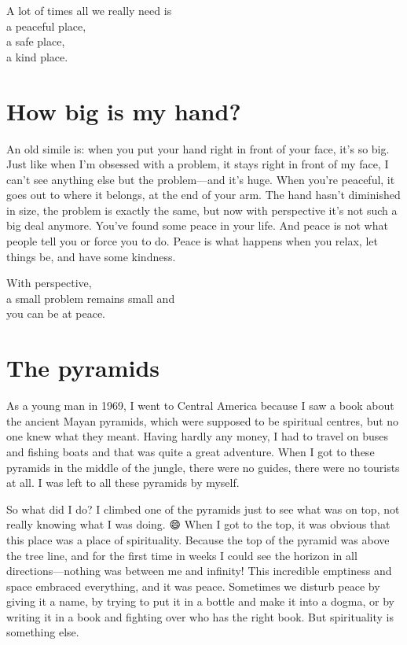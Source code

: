 \documentclass[12pt, openany]{book}
\newenvironment{aphorism}%
{%
\begin{center}\begin{itshape}
}%
{\end{itshape}\end{center}
}%
\begin{document}
\begin{aphorism}
A lot of times all we really need is\\  
a peaceful place,\\ 
a safe place,\\  
a kind place.
\end{aphorism}

\section*{How big is my hand?}

An old simile is: when you put your hand right in front of your face, it’s so big. Just like when I’m obsessed with a problem, it stays right in front of my face, I can’t see anything else but the problem—and it’s huge. When you’re peaceful, it goes out to where it belongs, at the end of your arm. The hand hasn’t diminished in size, the problem is exactly the same, but now with perspective it’s not such a big deal anymore. You’ve found some peace in your life. And peace is not what people tell you or force you to do. Peace is what happens when you relax, let things be, and have some kindness. 

\begin{aphorism}
With perspective,\\  
a small problem remains small and\\ 
you can be at peace.
\end{aphorism}

\section*{The pyramids}

As a young man in 1969, I went to Central America because I saw a book about the ancient Mayan pyramids, which were supposed to be spiritual centres, but no one knew what they meant. Having hardly any money, I had to travel on buses and fishing boats and that was quite a great adventure. When I got to these pyramids in the middle of the jungle, there were no guides, there were no tourists at all. I was left to all these pyramids by myself. 

So what did I do? I climbed one of the pyramids just to see what was on top, not really knowing what I was doing. 😄 When I got to the top, it was obvious that this place was a place of spirituality. Because the top of the pyramid was above the tree line, and for the first time in weeks I could see the horizon in all directions—nothing was between me and infinity! This incredible emptiness and space embraced everything, and it was peace. Sometimes we disturb peace by giving it a name, by trying to put it in a bottle and make it into a dogma, or by writing it in a book and fighting over who has the right book. But spirituality is something else. 
\end{document}
